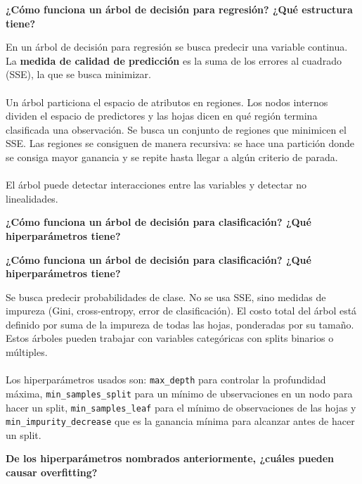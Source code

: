 \documentclass[10pt]{memoir}
\begin{document}
\clearpage
\begin{center}
	\textbf{\Large ¿Cómo funciona un árbol de decisión para regresión? ¿Qué estructura tiene?} \\
\end{center}
\noindent En un árbol de decisión para regresión se busca predecir una variable continua. La \textbf{medida de calidad de predicción} es la suma de los errores al cuadrado (SSE), la que se busca minimizar. \\
\\
Un árbol particiona el espacio de atributos en regiones. Los nodos internos dividen el espacio de predictores y las hojas dicen en qué región termina clasificada una observación. Se busca un conjunto de regiones que minimicen el SSE. Las regiones se consiguen de manera recursiva: se hace una partición donde se consiga mayor ganancia y se repite hasta llegar a algún criterio de parada. \\
\\
El árbol puede detectar interacciones entre las variables y detectar no linealidades.

\clearpage
\begin{center}
	\textbf{\Large ¿Cómo funciona un árbol de decisión para clasificación? ¿Qué hiperparámetros tiene?} \\
\end{center}

\clearpage
\begin{center}
	\textbf{\Large ¿Cómo funciona un árbol de decisión para clasificación? ¿Qué hiperparámetros tiene?} \\
\end{center}
\noindent Se busca predecir probabilidades de clase. No se usa SSE, sino medidas de impureza (Gini, cross-entropy, error de clasificación). El costo total del árbol está definido por suma de la impureza de todas las hojas, ponderadas por su tamaño. Estos árboles pueden trabajar con variables categóricas con splits binarios o múltiples. \\
\\
Los hiperparámetros usados son: \texttt{max\_depth} para controlar la profundidad máxima, \texttt{min\_samples\_split} para un mínimo de ubservaciones en un nodo para hacer un split, \texttt{min\_samples\_leaf} para el mínimo de observaciones de las hojas y \texttt{min\_impurity\_decrease} que es la ganancia mínima para alcanzar antes de hacer un split.

\clearpage
\begin{center}
	\textbf{\Large De los hiperparámetros nombrados anteriormente, ¿cuáles pueden causar overfitting?} \\
\end{center}
\end{document}
